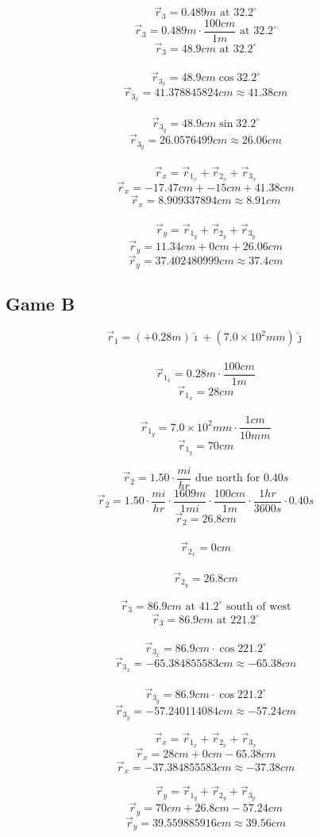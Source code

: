 \documentclass[11pt, letterpaper, includehead]{article}
\begin{document}
$$\vec{r}_3 = 0.489m\text{ at }32.2^{\circ}$$
$$\vec{r}_3 = 0.489m\cdot\frac{100cm}{1m}\text{ at }32.2^{\circ}$$
$$\vec{r}_3 = 48.9cm\text{ at }32.2^{\circ}$$\\
$$\vec{r}_{3_x} = 48.9cm\cos32.2^{\circ}$$
$$\vec{r}_{3_x} = 41.378845824cm \approx 41.38cm$$\\
$$\vec{r}_{3_y} = 48.9cm\sin32.2^{\circ}$$
$$\vec{r}_{3_y} = 26.0576499cm \approx 26.06cm$$\\

$$\vec{r}_x = \vec{r}_{1_x} + \vec{r}_{2_x} + \vec{r}_{3_x}$$
$$\vec{r}_x = -17.47cm + -15cm + 41.38cm$$
$$\vec{r}_x = 8.909337894cm \approx{8.91cm}$$\\
$$\vec{r}_y = \vec{r}_{1_y} + \vec{r}_{2_y} + \vec{r}_{3_y}$$
$$\vec{r}_y = 11.34cm +  0cm + 26.06cm$$
$$\vec{r}_y = 37.402480999cm \approx 37.4cm$$

\subsection{Game B} %

$$\vec{r}_1 = (+0.28m)\hat\imath+(7.0\times10^2mm)\hat\jmath$$\\
$$\vec{r}_{1_x} = 0.28m\cdot\frac{100cm}{1m}$$
$$\vec{r}_{1_x} = 28cm$$\\
$$\vec{r}_{1_y} = 7.0\times10^2mm\cdot\frac{1cm}{10mm}$$
$$\vec{r}_{1_y} = 70cm$$

$$\vec{r}_2 = 1.50\cdot\frac{mi}{hr} \text{ due north for }0.40s$$
$$\vec{r}_2 = 1.50\cdot\frac{mi}{hr}\cdot\frac{1609m}{1mi}\cdot\frac{100cm}{1m}\cdot\frac{1hr}{3600s}\cdot0.40s$$
$$\vec{r}_2 = 26.8cm$$\\
$$\vec{r}_{2_x} = 0cm$$\\
$$\vec{r}_{2_y} = 26.8cm$$

$$\vec{r}_3 = 86.9cm \text{ at } 41.2^{\circ} \text{ south of west}$$
$$\vec{r}_3 = 86.9cm \text{ at } 221.2^{\circ}$$\\
$$\vec{r}_{3_x} = 86.9cm\cdot\cos221.2^{\circ}$$
$$\vec{r}_{3_x} = -65.384855583cm \approx -65.38cm$$\\
$$\vec{r}_{3_y} = 86.9cm\cdot\cos221.2^{\circ}$$
$$\vec{r}_{3_y} = -57.240114084cm \approx -57.24cm$$

$$\vec{r}_x = \vec{r}_{1_x} + \vec{r}_{2_x} + \vec{r}_{3_x}$$
$$\vec{r}_x = 28cm + 0cm -65.38cm$$
$$\vec{r}_x = -37.384855583cm \approx -37.38cm$$

$$\vec{r}_y = \vec{r}_{1_y} + \vec{r}_{2_y} + \vec{r}_{3_y}$$
$$\vec{r}_y = 70cm + 26.8cm - 57.24cm$$
$$\vec{r}_y = 39.559885916cm \approx 39.56cm$$
\end{document}
